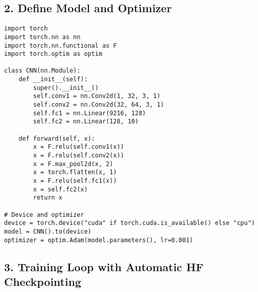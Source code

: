 \documentclass[a4paper, 12pt]{article}
\begin{document}
\subsection*{2. Define Model and Optimizer}

\begin{tcolorbox}[colback=green!5!white, colframe=green!75!black, title=Example CNN Model]
\begin{verbatim}
import torch
import torch.nn as nn
import torch.nn.functional as F
import torch.optim as optim

class CNN(nn.Module):
    def __init__(self):
        super().__init__()
        self.conv1 = nn.Conv2d(1, 32, 3, 1)
        self.conv2 = nn.Conv2d(32, 64, 3, 1)
        self.fc1 = nn.Linear(9216, 128)
        self.fc2 = nn.Linear(128, 10)

    def forward(self, x):
        x = F.relu(self.conv1(x))
        x = F.relu(self.conv2(x))
        x = F.max_pool2d(x, 2)
        x = torch.flatten(x, 1)
        x = F.relu(self.fc1(x))
        x = self.fc2(x)
        return x

# Device and optimizer
device = torch.device("cuda" if torch.cuda.is_available() else "cpu")
model = CNN().to(device)
optimizer = optim.Adam(model.parameters(), lr=0.001)
\end{verbatim}
\end{tcolorbox}

\subsection*{3. Training Loop with Automatic HF Checkpointing}
\end{document}
